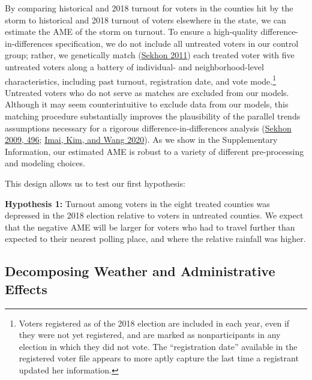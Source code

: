 \documentclass[
  12pt,
]{article}
\begin{document}
By comparing historical and 2018 turnout for voters in the counties hit by the storm to historical and 2018 turnout of voters elsewhere in the state, we can estimate the AME of the storm on turnout. To ensure a high-quality difference-in-differences specification, we do not include all untreated voters in our control group; rather, we genetically match (\protect\hyperlink{ref-Sekhon2011}{Sekhon 2011}) each treated voter with five untreated voters along a battery of individual- and neighborhood-level characteristics, including past turnout, registration date, and vote mode.\footnote{Voters registered as of the 2018 election are included in each year, even if they were not yet registered, and are marked as nonparticipants in any election in which they did not vote. The ``registration date'' available in the registered voter file appears to more aptly capture the last time a registrant updated her information.} Untreated voters who do not serve as matches are excluded from our models. Although it may seem counterintuitive to exclude data from our models, this matching procedure substantially improves the plausibility of the parallel trends assumptions necessary for a rigorous difference-in-differences analysis (\protect\hyperlink{ref-Sekhon2009}{Sekhon 2009, 496}; \protect\hyperlink{ref-Imai2020}{Imai, Kim, and Wang 2020}). As we show in the Supplementary Information, our estimated AME is robust to a variety of different pre-processing and modeling choices.

This design allows us to test our first hypothesis:

\textbf{Hypothesis 1:} Turnout among voters in the eight treated counties was depressed in the 2018 election relative to voters in untreated counties. We expect that the negative AME will be larger for voters who had to travel further than expected to their nearest polling place, and where the relative rainfall was higher.

\hypertarget{decomposing-weather-and-administrative-effects}{%
\subsection*{Decomposing Weather and Administrative Effects}\label{decomposing-weather-and-administrative-effects}}
\end{document}
